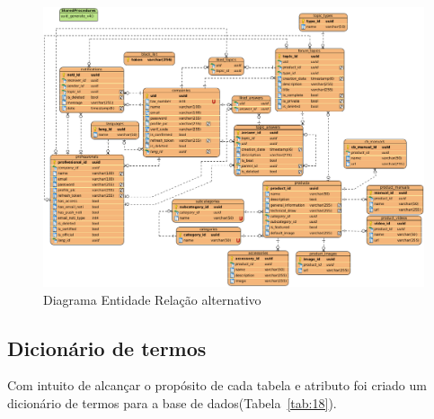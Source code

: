 \begin{figure}[htb]
  \centering
  
  \includegraphics[width=\textwidth]{images/diagramas/diagrama_bd_alt.png}
  \caption{Diagrama Entidade Relação alternativo}
  \label{fig:21}
\end{figure}

\newpage

\subsection{Dicionário de termos}

Com intuito de alcançar o propósito de cada tabela e atributo 
foi criado um dicionário de termos para a base de dados(Tabela~\ref{tab:18}).

